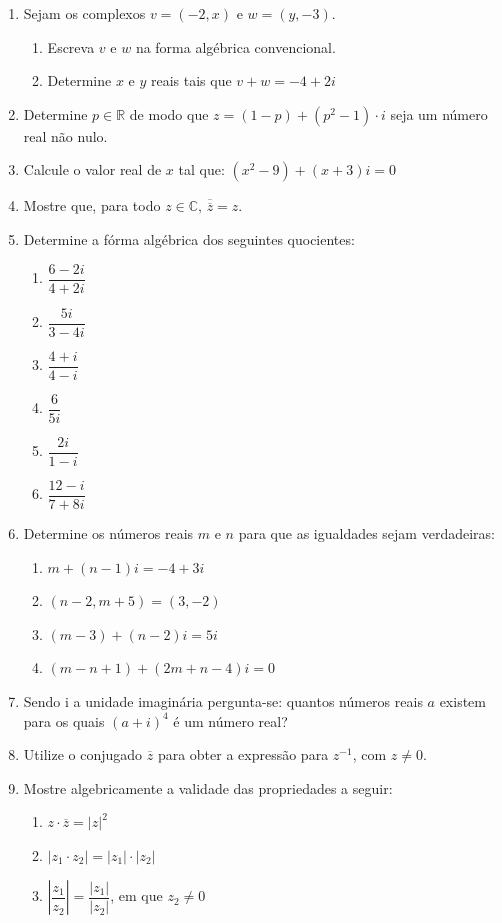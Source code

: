 \documentclass[a4paper, 11pt]{article}
\begin{document}
\begin{enumerate}
\item Sejam os complexos $v = (-2,x)$ e $w = (y,-3)$.
	\begin{enumerate}
	\item Escreva $v$ e $w$ na forma algébrica convencional.
	\item Determine $x$ e $y$ reais tais que $v + w = -4 + 2i$ 
	\end{enumerate}

\item Determine $p \in \mathbb{R}$ de modo que $z = (1-p)+(p^2-1)\cdot i$ seja um número real não nulo.

\item Calcule o valor real de $x$ tal que: $(x^2 - 9) + (x + 3)i = 0$

\item Mostre que, para todo $z \in \mathbb{C}, \, \overline{\overline{z}} = z$.

\item Determine a fórma algébrica dos seguintes quocientes:
	\begin{enumerate}
	\item $\dfrac{6 - 2i}{4 + 2i}$
	\item $\dfrac{5i}{3-4i}$
	\item $\dfrac{4 + i}{4 - i}$
	\item $\dfrac{6}{5i}$
	\item $\dfrac{2i}{1-i}$	
	\item $\dfrac{12-i}{7+8i}$	
	\end{enumerate}

\item Determine os números reais $m$ e $n$ para que as igualdades sejam verdadeiras:
	\begin{enumerate}
	\item $m+(n-1)i = -4+3i$
	\item $(n-2,m+5) = (3,-2)$
	\item $(m-3)+(n-2)i = 5i$
	\item $(m-n+1)+(2m+n-4)i = 0$
	\end{enumerate}

\item Sendo i a unidade imaginária pergunta-se: quantos números reais $a$ existem para os quais $(a+i)^4$ é um número real?

\item Utilize o conjugado $\overline{z}$ para obter a expressão para $z^{-1}$, com $z \neq 0$.

\item Mostre algebricamente a validade das propriedades a seguir:
	\begin{enumerate}
	\item $z \cdot \overline{z} = |z|^2$
	\item $|z_1 \cdot z_2| = |z_1| \cdot |z_2|$
	\item $|\dfrac{z_1}{z_2}| = \dfrac{|z_1|}{|z_2|}$, em que $z_2 \neq 0$
	\end{enumerate}


\end{enumerate}
\end{document}
